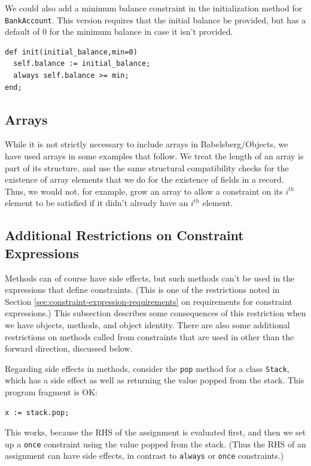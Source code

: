 \documentclass{article}
\begin{document}
We could also add a minimum balance constraint in the initialization
method for \verb|BankAccount|.  This version requires that the initial
balance be provided, but has a default of 0 for the minimum balance in
case it isn't provided.

\begin{verbatim}
def init(initial_balance,min=0)
  self.balance := initial_balance;
  always self.balance >= min;
end;
\end{verbatim}

\subsection{Arrays}

While it is not strictly necessary to include arrays in
Babelsberg/Objects, we have used arrays in some examples that follow.
We treat the length of an array is part of its structure, and use the
same structural compatibility checks for the existence of array
elements that we do for the existence of fields in a record.  Thus, we
would not, for example, grow an array to allow a constraint on its
$i^{th}$ element to be satisfied if it didn't already have an $i^{th}$
element.

\subsection{Additional Restrictions on Constraint Expressions}
\label{sec:additional-constraint-restrictions}

Methods can of course have side effects, but 
such methods can't be used in the expressions that define
constraints.  (This is one of the restrictions noted in Section
\ref{sec:constraint-expression-requirements} on requirements for
constraint expressions.)  This subsection describes some consequences
of this restriction when we have objects, methods, and object
identity.  There are also some additional restrictions on methods
called from constraints that are used in other than the forward
direction, discussed below.

Regarding side effects in methods, consider the \verb|pop| method for
a class \verb|Stack|, which has a side effect as well as returning the
value popped from the stack.  This program fragment is OK:

\begin{verbatim}
x := stack.pop;
\end{verbatim}

This works, because the RHS of the assignment is evaluated first, and
then we set up a \verb|once| constraint using the value popped from the
stack.  (Thus the RHS of an assignment can have side effects, in contrast
to \verb|always| or \verb|once| constraints.)
\end{document}
